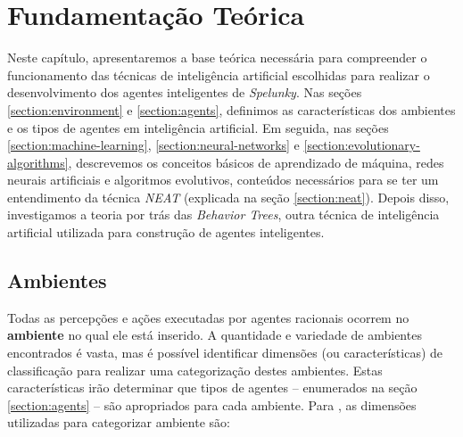 \chapter{\label{chap:theory}Fundamentação Teórica}
Neste capítulo, apresentaremos a base teórica necessária para compreender o
funcionamento das técnicas de inteligência artificial escolhidas para realizar o
desenvolvimento dos agentes inteligentes de \textit{Spelunky}. Nas seções
\ref{section:environment} e \ref{section:agents}, definimos as características
dos ambientes e os tipos de agentes em inteligência artificial. Em seguida, nas
seções \ref{section:machine-learning}, \ref{section:neural-networks} e
\ref{section:evolutionary-algorithms}, descrevemos os conceitos básicos de
aprendizado de máquina, redes neurais artificiais e algoritmos evolutivos,
conteúdos necessários para se ter um entendimento da técnica \textit{NEAT}
(explicada na seção \ref{section:neat}). Depois disso, investigamos a teoria por
trás das \textit{Behavior Trees}, outra técnica de inteligência artificial
utilizada para construção de agentes inteligentes.


\section{\label{section:environment}Ambientes}
Todas as percepções e ações executadas por agentes racionais ocorrem no
\textbf{ambiente} no qual ele está inserido. A quantidade e variedade de
ambientes encontrados é vasta, mas é possível identificar dimensões (ou
características) de classificação para realizar uma categorização destes
ambientes. Estas características irão determinar que tipos de agentes --
enumerados na seção \ref{section:agents} -- são apropriados para cada ambiente.
Para \cite{RussellNorvig200912}, as dimensões utilizadas para categorizar
ambiente são:

